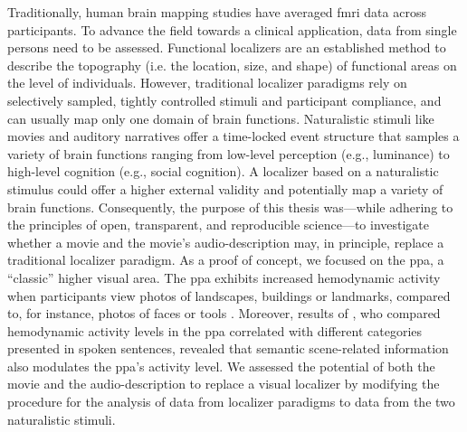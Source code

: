 
%
Traditionally, human brain mapping studies have averaged \ac{fmri} data across
participants.
%
To advance the field towards a clinical application, data from single persons
need to be assessed.
Functional localizers are an established method to describe the topography (i.e.
the location, size, and shape) of functional areas on the level of individuals.
However, traditional localizer paradigms rely on selectively sampled, tightly
controlled stimuli and participant compliance, and can usually map only one
domain of brain functions.
Naturalistic stimuli like movies and auditory narratives offer a time-locked
event structure that samples a variety of brain functions ranging from low-level
perception (e.g., luminance) to high-level cognition (e.g., social cognition).
%
A localizer based on a naturalistic stimulus could offer a higher external
validity and potentially map a variety of brain functions.
Consequently, the purpose of this thesis was---while adhering to the principles
of open, transparent, and reproducible science---to investigate whether a movie
and the movie's audio-description may, in principle, replace a traditional
localizer paradigm.
As a proof of concept, we focused on the \ac{ppa}, a ``classic'' higher visual
area.
%
The \ac{ppa} exhibits increased hemodynamic activity when participants view
photos of landscapes, buildings or landmarks, compared to, for instance, photos
of faces or tools \citep[cf,][for reviews]{epstein2014neural, aminoff2013role}.
%
Moreover, results of \citet{aziz2008modulation}, who compared hemodynamic
activity levels in the \ac{ppa} correlated with different categories presented
in spoken sentences, revealed that semantic scene-related information also
modulates the \ac{ppa}'s activity level.
%
We assessed the potential of both the movie and the audio-description to replace
a visual localizer by modifying the procedure for the analysis of data from
localizer paradigms to data from the two naturalistic stimuli.



\begin{comment}

%
First, hemodynamic responses correlating with the temporal structure of
    annotated stimulus features \citep[cf.][]{haeusler2016cutanno,
    haeusler2021speechanno} were modeled in order to create \ac{glm}
    $t$-contrasts that aimed to localize the \ac{ppa}.


Second, we applied functional alignment procedure as a novel method in order to
estimate results from the visual localizer \citep[cf.][]{sengupta2016extension},
movie and audio-description \citep[cf.][]{haeusler2022processing} in one
participant from results of participants in a reference group.

\end{comment}




